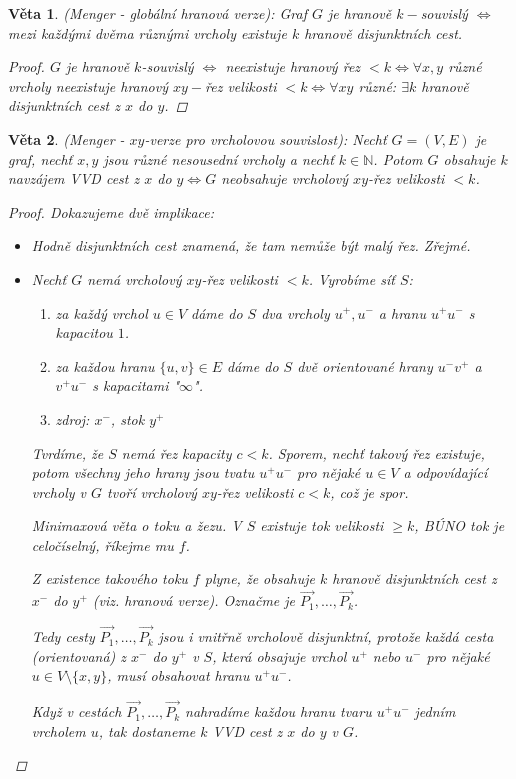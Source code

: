 \documentclass[10pt,a4paper]{article}
\newtheorem{veta}{Věta}
\newcommand{\N}{{\mathbb{N}}}       %
\begin{document}
\begin{veta} (Menger - globální hranová verze): \normalfont
    Graf $G$ je hranově $k-$souvislý $\iff$ mezi každými dvěma různými vrcholy existuje $k$ hranově disjunktních cest.
    \begin{proof}
        $G$ je hranově $k$-souvislý $\iff$ neexistuje hranový řez $<k \iff \forall x,y$ různé vrcholy neexistuje hranový $xy-$řez velikosti $<k \iff \forall xy$ různé: $\exists k$ hranově disjunktních cest z $x$ do $y$.
    \end{proof}
\end{veta}

\begin{veta} (Menger - $xy$-verze pro vrcholovou souvislost): \normalfont
    Nechť $G=(V, E)$ je graf, nechť $x,y$ jsou různé nesousední vrcholy a nechť $k \in \N$.
    Potom $G$ obsahuje $k$ navzájem VVD cest z $x$ do $y \iff G$ neobsahuje vrcholový $xy$-řez velikosti $<k$.
    \begin{proof}
        Dokazujeme dvě implikace:
        \begin{itemize}
            \item [$\implies$] Hodně disjunktních cest znamená, že tam nemůže být malý řez. Zřejmé.
            \item [$\Longleftarrow$] Nechť $G$ nemá vrcholový $xy$-řez velikosti $<k$.
            Vyrobíme síť $S$:
            \begin{enumerate}
                \item za každý vrchol $u\in V$ dáme do $S$ dva vrcholy $u^+, u^-$ a hranu $u^+u^-$ s kapacitou $1$.
                \item za každou hranu $\{u,v\}\in E$ dáme do $S$ dvě orientované hrany $u^-v^+$ a $v^+u^-$ s kapacitami "$\infty$".
                \item zdroj: $x^-$, stok $y^+$
            \end{enumerate}
            Tvrdíme, že $S$ nemá řez kapacity $c<k$. \textit{Sporem, nechť takový řez existuje, potom všechny jeho hrany jsou tvatu $u^+u^-$ pro nějaké $u\in V$ a odpovídající vrcholy v $G$ tvoří vrcholový $xy$-řez velikosti $c<k$, což je spor.}

            Minimaxová věta o toku a žezu. V $S$ existuje tok velikosti $\geq k$, BÚNO tok je celočíselný, říkejme mu $f$.

            Z existence takového toku $f$ plyne, že obsahuje $k$ hranově disjunktních cest z $x^-$ do $y^+$ (viz. hranová verze).
            Označme je $\vec {P_1}, \dots, \vec{P_k}$.

            Tedy cesty $\vec {P_1}, \dots, \vec{P_k}$ jsou i vnitřně vrcholově disjunktní, protože každá cesta (orientovaná) z $x^-$ do $y^+$ v $S$, která obsajuje vrchol $u^+$ nebo $u^-$ pro nějaké $u\in V \setminus \{x,y\}$, musí obsahovat hranu $u^+u^-$.

            Když v cestách $\vec {P_1}, \dots, \vec{P_k}$ nahradíme každou hranu tvaru $u^+u^-$ jedním vrcholem $u$, tak dostaneme $k$ VVD cest z $x$ do $y$ v $G$.
        \end{itemize}
    \end{proof}
\end{veta}
\end{document}
